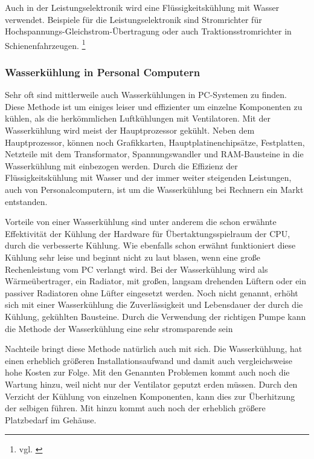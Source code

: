 Auch in der Leistungselektronik wird eine Flüssigkeitskühlung mit Wasser verwendet. Beispiele für die Leistungselektronik sind Stromrichter für Hochspannungs-Gleichstrom-Übertragung oder auch 
Traktionsstromrichter in Schienenfahrzeugen. \footnote{vgl. \cite{Wasserkuehlung}}

\newpage

\subsubsection{Wasserkühlung in Personal Computern}

Sehr oft sind mittlerweile auch Wasserkühlungen in PC-Systemen zu finden. Diese Methode ist um einiges leiser und effizienter um einzelne Komponenten zu kühlen, als die herkömmlichen Luftkühlungen mit Ventilatoren. Mit der Wasserkühlung wird meist der Hauptprozessor gekühlt. Neben dem Hauptprozessor, können noch Grafikkarten, Hauptplatinenchipsätze, Festplatten, Netzteile mit dem Transformator, Spannungswandler und RAM-Bausteine in die Wasserkühlung mit einbezogen werden.
Durch die Effizienz der Flüssigkeitskühlung mit Wasser und der immer weiter steigenden Leistungen, auch von Personalcomputern, ist um die Wasserkühlung bei Rechnern ein Markt entstanden.

Vorteile von einer Wasserkühlung sind unter anderem die schon erwähnte Effektivität der Kühlung der Hardware für Übertaktungsspielraum der CPU, durch die verbesserte Kühlung. Wie ebenfalls schon erwähnt funktioniert diese Kühlung sehr leise und beginnt nicht zu laut blasen, wenn eine große Rechenleistung vom PC verlangt wird. Bei der Wasserkühlung wird als Wärmeübertrager, ein Radiator, mit großen, langsam drehenden Lüftern oder ein passiver Radiatoren ohne Lüfter eingesetzt werden.
Noch nicht genannt, erhöht sich mit einer Wasserkühlung die Zuverlässigkeit und Lebensdauer der durch die Kühlung, gekühlten Bausteine. Durch die Verwendung der richtigen Pumpe kann die Methode der Wasserkühlung eine sehr stromsparende sein

Nachteile bringt diese Methode natürlich auch mit sich. Die Wasserkühlung, hat einen erheblich größeren Installationsaufwand und damit auch vergleichsweise hohe Kosten zur Folge. Mit den Genannten Problemen kommt auch noch die Wartung hinzu, weil nicht nur der Ventilator geputzt erden müssen.  Durch den Verzicht der Kühlung von einzelnen Komponenten, kann dies zur Überhitzung der selbigen führen. Mit hinzu kommt auch noch der erheblich größere Platzbedarf im Gehäuse. 

